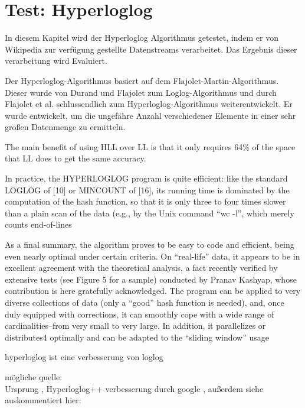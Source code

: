 \section{Test: Hyperloglog}
In diesem Kapitel wird der Hyperloglog Algorithmus getestet, 
indem er von Wikipedia zur verfügung gestellte Datenstreams verarbeitet. 
Das Ergebnis dieser verarbeitung wird Evaluiert. 

Der Hyperloglog-Algorithmus basiert auf dem Flajolet-Martin-Algorithmus.
Dieser wurde von Durand und Flajolet \cite{durand2003} zum Loglog-Algorithmus 
und durch Flajolet et al. \cite{flajolet2007} schlussendlich zum Hyperloglog-Algorithmus weiterentwickelt.
Er wurde entwickelt, um die ungefähre Anzahl verschiedener Elemente in einer sehr großen Datenmenge zu ermitteln. 


The main benefit of using HLL over LL is that it only requires 64\% of the space that LL does to get the same accuracy. 

In practice, the HYPERLOGLOG program is quite efficient: like the standard LOGLOG of [10] or
MINCOUNT of [16], its running time is dominated by the computation of the hash function, so that it is
only three to four times slower than a plain scan of the data (e.g., by the Unix command “wc -l”, which
merely counts end-of-lines \cite{flajolet2007}

As a final summary, the algorithm proves to be easy to code and efficient, being even nearly optimal
under certain criteria. On “real-life” data, it appears to be in excellent agreement with the theoretical analysis,
a fact recently verified by extensive tests (see Figure 5 for a sample) conducted by Pranav Kashyap,
whose contribution is here gratefully acknowledged.
The program can be applied to very diverse collections
of data (only a “good” hash function is needed), and, once duly equipped with corrections, it can
smoothly cope with a wide range of cardinalities–from very small to very large. In addition, it parallelizes
or distributes4 optimally and can be adapted to the “sliding window” usage \cite{flajolet2007}

hyperloglog ist eine verbesserung von loglog \cite{flajolet2007}

mögliche quelle: \\
Ursprung \cite{flajolet2007},
Hyperloglog++ verbesserung durch google \cite{heule2013},
außerdem siehe auskommentiert hier:
